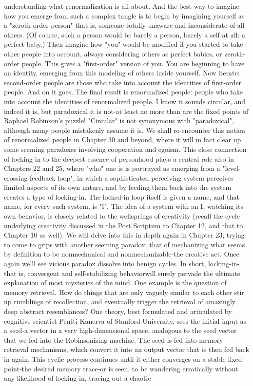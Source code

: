 understanding what renormalization is all about. And the best way to imagine how
you emerge from such a complex tangle is to begin by imagining yourself as a
"zeroth-order person"-that is, someone totally unaware and inconsiderate of all others.
(Of course, such a person would be barely a person, barely a self at all: a perfect
baby.) Then imagine how "you" would be modified if you started to take other people
into account, always considering others as perfect babies, or zeroth-order people. This
gives a "first-order" version of you. You are beginning to have an identity, emerging
from this modeling of others inside yourself. Now iterate: second-order people are
those who take into account the identities of first-order people. And on it goes. The
final result is renormalized people: people who take into account the identities of
renormalized people. I know it sounds circular, and indeed it is, but paradoxical it is
not-at least no more than are the fixed points of Raphael Robinson's puzzle!
"Circular" is not synonymous with "paradoxical", although many people mistakenly
assume it is. We shall re-encounter this notion of renormalized people in Chapter 30
and beyond, where it will in fact clear up some seeming paradoxes involving
cooperation and egoism.
         This close connection of locking-in to the deepest essence of personhood plays
a central role also in Chapters 22 and 25, where "who" one is is portrayed as emerging
from a "level-crossing feedback loop", in which a sophisticated perceiving system
perceives limited aspects of its own nature, and by feeding them back into the system
creates a type of locking-in. The locked-in loop itself is given a name, and that name,
for every such system, is "I".
         The idea of a system with an I, watching its own behavior, is closely related to
the wellsprings of creativity (recall the cycle underlying creativity discussed in the
Post Scriptum to Chapter 12, and that to Chapter 10 as well). We will delve into this
in depth again in Chapter 23, trying to come to grips with another seeming paradox:
that of mechanizing what seems by definition to be nonmechanical and
nonmechanizable-the creative act. Once again we'll see vicious paradox dissolve into
benign cycles.
         In short, locking-in-that is, convergent and self-stabilizing behaviorwill surely
pervade the ultimate explanation of most mysteries of the mind. One example is the
question of memory retrieval. How do things that are only vaguely similar to each
other stir up rumblings of recollection, and eventually trigger the retrieval of
amazingly deep abstract resemblances? One theory, best formulated and articulated
by cognitive scientist Pentti Kanerva of Stanford University, sees the initial input as a
seed-a vector in a very high-dimensional space, analogous to the seed vector that we
fed into the Robinsonizing machine. The seed is fed into memory-retrieval
mechanisms, which convert it into an output vector that is then fed back in again. This
cyclic process continues until it either converges on a stable fixed point-the desired
memory trace-or is seen. to be wandering erratically without any likelihood of locking
in, tracing out a chaotic




